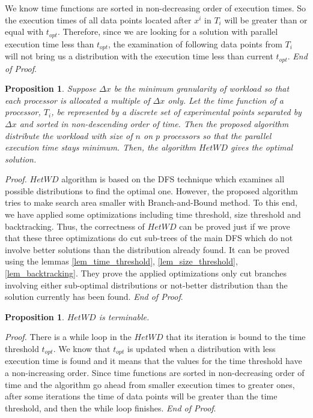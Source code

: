 \documentclass[12pt]{article}
\newtheorem{proposition}[theorem]{Proposition}
\begin{document}
We know time functions are sorted in non-decreasing order of execution times. So the execution times of all data points located after $x^i$ in $T_i$ will be greater than or equal with $t_{opt}$. Therefore, since we are looking for a solution with parallel execution time less than $t_{opt}$, the examination of following data points from $T_i$ will not bring us a distribution with the execution time less than current $t_{opt}$. \textit{End of Proof}.

\begin{proposition}
	Suppose $\Delta x$ be the minimum granularity of workload so that each processor is allocated a multiple of $\Delta x$ only. Let the time function of a processor, $T_i$, be represented by a discrete set of experimental points separated by $\Delta x$ and sorted in non-descending order of time. Then the proposed algorithm distribute the workload with size of $n$ on $p$ processors so that the parallel execution time stays minimum. Then, the algorithm $HetWD$ gives the optimal solution.
\end{proposition}

\textit{Proof.} $HetWD$ algorithm is based on the DFS technique which examines all possible distributions to find the optimal one. However, the proposed algorithm tries to make search area smaller with Branch-and-Bound method. To this end, we have applied some optimizations including time threshold, size threshold and backtracking. Thus, the correctness of $HetWD$ can be proved just if we prove that these three optimizations do cut sub-trees of the main DFS which do not involve better solutions than the distribution already found. It can be proved using the lemmas \ref{lem_time_threshold}, \ref{lem_size_threshold}, \ref{lem_backtracking}. They prove the applied optimizations only cut branches involving either sub-optimal distributions or not-better distribution than the solution currently has been found. \textit{End of Proof}.

\begin{proposition}
	$HetWD$ is terminable.
\end{proposition}

\textit{Proof.} There is a while loop in the $HetWD$ that its iteration is bound to the time threshold $t_{opt}$. We know that $t_{opt}$ is updated when a distribution with less execution time is found and it means that the values for the time threshold have a non-increasing order. Since time functions are sorted in non-decreasing order of time and the algorithm go ahead from smaller execution times to greater ones, after some iterations the time of data points will be greater than the time threshold, and then the while loop finishes. \textit{End of Proof}.
\end{document}
